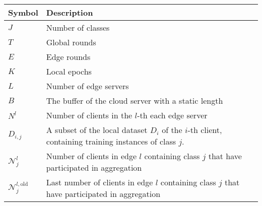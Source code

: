 \documentclass{article}
\begin{document}
\begin{table}[H]
    \centering
    \begin{tabular}{@{}lp{10cm}@{}}
        \toprule
        \textbf{Symbol}                       & \textbf{Description}                                                                                                                  \\
        \midrule
        \( J \)                               & Number of classes                                                                                                                     \\
        \( T \)                               & Global rounds                                                                                                                         \\
        \( E \)                               & Edge rounds                                                                                                                           \\
        \( K \)                               & Local epochs                                                                                                                          \\
        \( L \)                               & Number of edge servers                                                                                                                \\
        \( B \)                               & The buffer of the cloud server with a static length                                                                                   \\
        \( N^l \)                             & Number of clients in the $l$-th each edge server                                                                                      \\
        \( D_{i,j} \)                         & A subset of the local dataset \(D_i\) of the $i$-th client, containing training instances of class $j$.                                        \\
        \( \mathcal{N}_j^l  \)                & Number of clients in edge $l$ containing class $j$ that have participated in aggregation                                              \\
        \( {\mathcal{N}_j^{l,\text{old}}}  \) & Last number of clients in edge $l$ containing class $j$ that have participated in aggregation                                         \\


\end{tabular}
\end{table}
\end{document}
